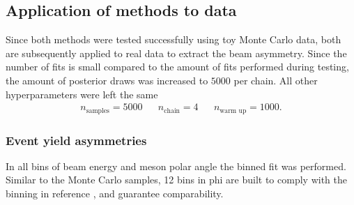 \subsection{Application of methods to data}
Since both methods were tested successfully using toy Monte Carlo data, both are subsequently applied to real data to extract the beam asymmetry. Since the number of fits is small compared to the amount of fits performed during testing, the amount of posterior draws was increased to $5000$ per chain. All other hyperparameters were left the same
\begin{align}
	n_\text{samples}=5000 && n_\text{chain}=4 && n_\text{warm up}=1000.
\end{align}
\subsubsection{Event yield asymmetries}
In all bins of beam energy and meson polar angle the binned fit was performed. Similar to the Monte Carlo samples, 12 bins in phi are built to comply with the binning in reference \cite{farahphd}, and guarantee comparability.

